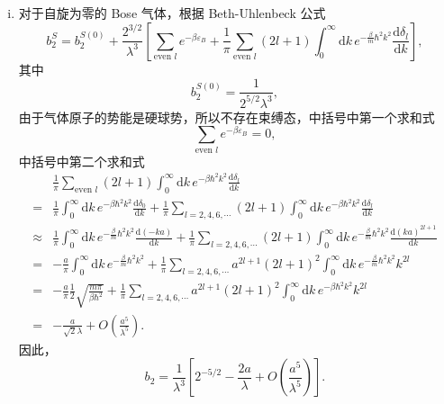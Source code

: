 \documentclass[reqno,a4paper,12pt]{amsart}
\begin{document}
\begin{enumerate}[1.]
\begin{tcolorbox}[breakable, colframe = black, colback = black!5!white]
\begin{enumerate}[i)]
\item 对于自旋为零的 Bose 气体，根据 Beth-Uhlenbeck 公式
\[
b_2^S=b_2^{S(0)}+\frac{2^{3/2}}{\lambda^3} \left[\sum_{\text{even }l}e^{-\beta\varepsilon_B} + \frac{1}{\pi}\sum_{\text{even }l}(2l+1)\int_0^{\infty}\mathrm{d}k\,e^{-\frac{\beta}{m}\hbar^2k^2}\frac{\mathrm{d}\delta_l}{\mathrm{d}k}\right],
\]
其中
\[
	b_2^{S(0)}=\frac{1}{2^{5/2}\lambda^3},
\]
由于气体原子的势能是硬球势，所以不存在束缚态，中括号中第一个求和式
\[
	\sum_{\text{even }l}e^{-\beta\varepsilon_B}=0,
\]
中括号中第二个求和式
\begin{align*}
	&\frac{1}{\pi}\sum_{\text{even }l}(2l+1)\int_0^{\infty}\mathrm{d}k\,e^{-\beta\hbar^2k^2}\frac{\mathrm{d}\delta_l}{\mathrm{d}k} \\
	=&\frac{1}{\pi}\int_0^{\infty}\mathrm{d}k\,e^{-\beta\hbar^2k^2}\frac{\mathrm{d}\delta_0}{\mathrm{d}k}+\frac{1}{\pi}\sum_{l=2,4,6,\cdots}(2l+1)\int_0^{\infty}\mathrm{d}k\,e^{-\beta\hbar^2k^2}\frac{\mathrm{d}\delta_l}{\mathrm{d}k}\\
	\approx&\frac{1}{\pi}\int_0^{\infty}\mathrm{d}k\,e^{-\frac{\beta}{m}\hbar^2k^2}\frac{\mathrm{d}(-ka)}{\mathrm{d}k}+\frac{1}{\pi}\sum_{l=2,4,6,\cdots}(2l+1)\int_0^{\infty}\mathrm{d}k\,e^{-\frac{\beta}{m}\hbar^2k^2}\frac{\mathrm{d}(ka)^{2l+1}}{\mathrm{d}k}\\
	=&-\frac{a}{\pi}\int_0^{\infty}\mathrm{d}k\,e^{-\frac{\beta}{m}\hbar^2k^2}+\frac{1}{\pi}\sum_{l=2,4,6,\cdots}a^{2l+1}(2l+1)^2\int_0^{\infty}\mathrm{d}k\,e^{-\frac{\beta}{m}\hbar^2k^2}k^{2l}\\
	=&-\frac{a}{\pi}\frac{1}{2}\sqrt{\frac{m\pi}{\beta\hbar^2}}+\frac{1}{\pi}\sum_{l=2,4,6,\cdots}a^{2l+1}(2l+1)^2\int_0^{\infty}\mathrm{d}k\,e^{-\beta\hbar^2k^2}k^{2l}\\
	=&-\frac{a}{\sqrt{2}\lambda}+O\left(\frac{a^5}{\lambda^5}\right).
\end{align*}
因此，
\[
	b_2=\frac{1}{\lambda^3}\left[2^{-5/2}-\frac{2a}{\lambda}+O\left(\frac{a^5}{\lambda^5}\right)\right].
\]

\end{enumerate}
\end{tcolorbox}


\end{enumerate}
\end{document}
